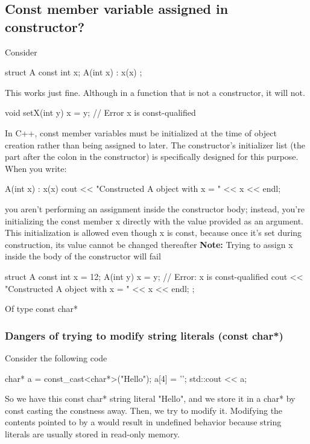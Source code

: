 \documentclass{report}
\begin{document}
\subsection{Const member variable assigned in constructor?}
\bigbreak \noindent 
Consider
\bigbreak \noindent 
\begin{cppcode}
    struct A{
        const int x;
        A(int x) : x(x) {}
    };
\end{cppcode}
\bigbreak \noindent 
This works just fine. Although in a function that is not a constructor, it will not.
\bigbreak \noindent 
\begin{cppcode}
    void setX(int y) {
        x = y; // Error x is const-qualified
    }
\end{cppcode}
\bigbreak \noindent 
In C++, const member variables must be initialized at the time of object creation rather than being assigned to later. The constructor’s initializer list (the part after the colon in the constructor) is specifically designed for this purpose. When you write:
\bigbreak \noindent 
\begin{cppcode}
A(int x) : x(x) { 
    cout << "Constructed A object with x = " << x << endl; 
}
\end{cppcode}
\bigbreak \noindent 
you aren’t performing an assignment inside the constructor body; instead, you’re initializing the const member x directly with the value provided as an argument. This initialization is allowed even though x is const, because once it’s set during construction, its value cannot be changed thereafter
\bigbreak \noindent 
\textbf{Note:} Trying to assign x inside the body of the constructor will fail
\bigbreak \noindent 
\begin{cppcode}
    struct A {
        const int x = 12;
        A(int y) { 
            x = y; // Error: x is const-qualified
            cout << "Constructed A object with x = " << x << endl; 
        } 
    };
\end{cppcode}

\pagebreak 
{}
\bigbreak \noindent 
Of type const char*

\pagebreak 
{}
\bigbreak \noindent 
\subsubsection{Dangers of trying to modify string literals (const char*)}
\bigbreak \noindent 
Consider the following code
\bigbreak \noindent 
\begin{cppcode}
    char* a = const_cast<char*>("Hello");
    a[4] = '\0';
    std::cout << a;
\end{cppcode}
\bigbreak \noindent 
So we have this const char* string literal "Hello", and we store it in a char* by const casting the constness away. Then, we try to modify it. 
\bigbreak \noindent 
Modifying the contents pointed to by a would result in undefined behavior because string literals are usually stored in read-only memory.
\end{document}
